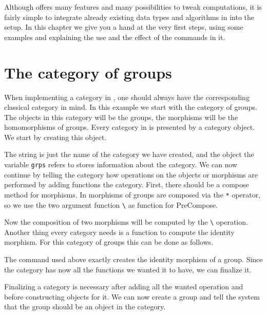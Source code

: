 Although \CapPkg offers many features and many possibilities to tweak computations,
it is fairly simple to integrate already existing data types and algorithms in \GAP
into the \CapPkg setup. In this chapter we give you a hand at the very first steps, using some
examples and explaining the use and the effect of the commands in it.

\section{The category of groups}

When implementing a category in \CapPkg, one should always have the corresponding classical
category in mind. In this example we start with the category of groups. The objects in this
category will be the groups, the morphisms will be the homomorphisms of groups. Every category
in \CapPkg is presented by a category \GAP object. We start by creating this object.



The string is just the name of the category we have created, and the object the variable
\texttt{grps} refers to stores information about the category. We can now continue by
telling the category how operations on the objects or morphisms are performed by adding
functions the category. First, there should be a compose method for morphisms. In \GAP
morphisms of groups are composed via the \texttt{*} operator, so we use the two
argument function \texttt{\textbackslash *} as function for \textrm{PreCompose}.



Now the composition of two morphisms will be computed by the \texttt{\textbackslash *} operation.
Another thing every category needs is a function to compute the identity morphism. For this
category of groups this can be done as follows.



The command used above exactly creates the identity morphism of a group. Since the category
has now all the functions we wanted it to have, we can finalize it.



Finalizing a category is necessary after adding all the wanted operation and before constructing objects
for it. We can now create a group and tell the system that the group should be an object in the category.


